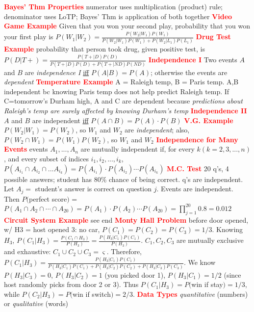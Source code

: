 \documentclass[10pt]{extarticle}
\let\oldtextbf\textbf
\renewcommand{\textbf}[1]{\textcolor{red}{\oldtextbf{#1}}}
\begin{document}
\textbf{Bayes' Thm Properties} numerator uses multiplication (product) rule; denominator uses LoTP; Bayes' Thm is application of both together
\textbf{Video Game Example} Given that you won your second play, probability that you won your first play is $P(W_{1}|W_{2})=\frac{P(W_{2}|W_{1})P(W_{1})}{P(W_{2}|W_{1})P(W_{1})+P(W_{2}|L_{1})P(L_{1})}$
\textbf{Drug Test Example} probability that person took drug, given positive test, is $P(D|T+) = \frac{P(T+|D)P(D)}{P(T+|D)P(D)+P(T+|ND)P(ND)}$
\textbf{Independence I} Two events $A$ and $B$ are \emph{independence I} \underline{iff} $P(A|B) = P(A)$; otherwise the events are \emph{dependent}
\textbf{Temperature Example} A = Raleigh temp, B = Paris temp. A,B independent bc knowing Paris temp does not help predict Raleigh temp. If C=tomorrow's Durham high, A and C are dependent because \emph{predictions about Raleigh's temp are surely affected by knowing Durham's temp}
\textbf{Independence II} $A$ and $B$ are independent \underline{iff} $P(A\cap B) = P(A)\cdot P(B)$
\textbf{V.G. Example} $P(W_{2}|W_{1})=P(W_{2})$, so $W_{1}$ and $W_{2}$ are \emph{independent}; also, $P(W_{2}\cap W_{1}) = P(W_{1})P(W_{2})$, so $W_{1}$ and $W_{2}$
\textbf{Independence for Many Events} events $A_{1},...,A_{n}$ are mutually independent if, for every $k (k=2,3,...,n)$, and every subset of indices $i_{1},i_{2},...,i_{k}$, $P(A_{i_{1}}\cap A_{i_{2}}\cap...A_{i_{k}}) = P(A_{i_{1}})\cdot P(A_{i_{2}})\cdots P(A_{i_{k}})$
\textbf{M.C. Test} 20 q's, 4 possible answers; student has 80\% chance of being correct. q's are independent. Let $A_{j} =$ student's answer is correct on question $j$. Events are independent. Then $P($perfect score$)$ = $P(A_{1}\cap A_{2}\cap \cdots \cap A_{20}) = P(A_{1})\cdot P(A_{2}) \cdots P(A_{20}) = \prod_{j=1}^{20}0.8=0.012$
\textbf{Circuit System Example} see end
\textbf{Monty Hall Problem} before door opened, w/ H3 = host opened 3: no car, $P(C_{1})= P(C_{2}) = P(C_{3}) = 1/3$. Knowing $H_{3}$, $P(C_{1}|H_{3}) = \frac{P(C_{1}\cap H_{3})}{P(H_{3})} = \frac{P(H_{3}|C_{1})P(C_{1})}{P(H_{3})}$. $C_{1}, C_{2}, C_{3}$ are mutually exclusive and exhaustive: $C_{1}\cup C_{2}\cup C_{3} = \varsigma$. Therefore, $P(C_{1}|H_{3}) = \frac{P(H_{3}|C_{1})P(C_{1})}{P(H_{3}|C_{1})P(C_{1})+P(H_{3}|C_{2})P(C_{2})+P(H_{3}|C_{3})P(C_{3})}$. We know $P(H_{3}|C_{3})=0$, $P(H_{3}|C_{2})=1$ (you picked door 1), $P(H_{3}|C_{1})=1/2$ (since host randomly picks from door 2 or 3). Thus $P(C_{1}|H_{3})=P($win if stay$) = 1/3$, while $P(C_{2}|H_{3}) = P($win if switch$) = 2/3$. 
\textbf{Data Types} \emph{quantitative} (numbers) or \emph{qualitative} (words)
\end{document}
